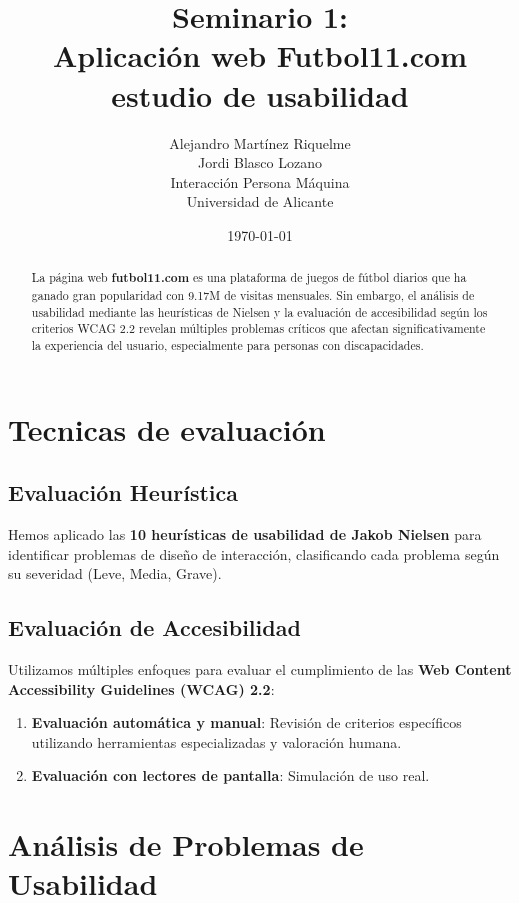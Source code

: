 \documentclass{article}
\title{Seminario 1: \\ Aplicación web Futbol11.com estudio de usabilidad }
\author{
	Alejandro Martínez Riquelme \\
	Jordi Blasco Lozano \\
	\small Interacción Persona Máquina \\
	\small Universidad de Alicante
}
\date{\today}
\begin{document}
	
	\maketitle

	\begin{abstract}
	\noindent 
	La página web \textbf{futbol11.com} es una plataforma de juegos de fútbol diarios que ha ganado gran popularidad con 9.17M de visitas mensuales. Sin embargo, el análisis de usabilidad mediante las heurísticas de Nielsen y la evaluación de accesibilidad según los criterios WCAG 2.2 revelan múltiples problemas críticos que afectan significativamente la experiencia del usuario, especialmente para personas con discapacidades.
	\end{abstract}

	
	\tableofcontents
	\newpage

	\section{Tecnicas de evaluación}
	
	\subsection{Evaluación Heurística}
	\noindent
	Hemos aplicado las \textbf{10 heurísticas de usabilidad de Jakob Nielsen} para identificar problemas de diseño de interacción, clasificando cada problema según su severidad (Leve, Media, Grave).

	\subsection{Evaluación de Accesibilidad}
	\noindent
	Utilizamos múltiples enfoques para evaluar el cumplimiento de las \textbf{Web Content Accessibility Guidelines (WCAG) 2.2}:
	\begin{enumerate}
		\item \textbf{Evaluación automática y manual}: Revisión de criterios específicos utilizando herramientas especializadas y valoración humana.
		\item \textbf{Evaluación con lectores de pantalla}: Simulación de uso real.
	\end{enumerate}

	\section{Análisis de Problemas de Usabilidad}
\end{document}
